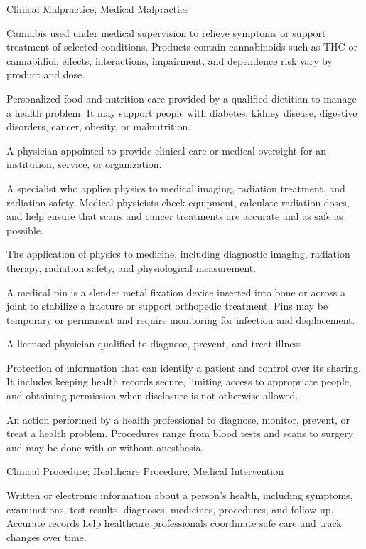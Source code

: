 \synonyms
Clinical Malpractice; Medical Malpractice

 Cannabis used under medical supervision to relieve symptoms or support treatment of selected conditions. Products contain cannabinoids such as THC or cannabidiol; effects, interactions, impairment, and dependence risk vary by product and dose.

 Personalized food and nutrition care provided by a qualified dietitian to manage a health problem. It may support people with diabetes, kidney disease, digestive disorders, cancer, obesity, or malnutrition.

 A physician appointed to provide clinical care or medical oversight for an institution, service, or organization.

 A specialist who applies physics to medical imaging, radiation treatment, and radiation safety. Medical physicists check equipment, calculate radiation doses, and help ensure that scans and cancer treatments are accurate and as safe as possible.

 The application of physics to medicine, including diagnostic imaging, radiation therapy, radiation safety, and physiological
measurement.

 A medical pin is a slender metal fixation device inserted into bone or across a joint to stabilize a fracture or support orthopedic treatment. Pins may be temporary or permanent and require monitoring for infection and displacement.

 A licensed physician qualified to diagnose, prevent, and treat illness.

 Protection of information that can identify a patient and control over its sharing. It includes keeping health records secure, limiting access to appropriate people, and obtaining permission when disclosure is not otherwise allowed.

 An action performed by a health professional to diagnose, monitor, prevent, or treat a health problem. Procedures range from blood tests and scans to surgery and may be done with or without anesthesia.

\synonyms
Clinical Procedure; Healthcare Procedure; Medical Intervention

 Written or electronic information about a person's health, including symptoms, examinations, test results, diagnoses, medicines, procedures, and follow-up. Accurate records help healthcare professionals coordinate safe care and track changes over time.


